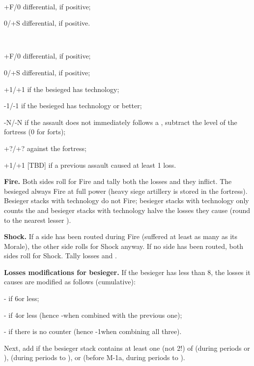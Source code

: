 ~\\
\begin{modlist}
\item[+F/0] \Fire differential, if positive;
\item[0/+S] \Shock differential, if positive.
\end{modlist}

~\\
\begin{modlist}
\item[+F/0] \Fire differential, if positive;
\item[0/+S] \Shock differential, if positive;
\item[+1/+1] if the besieged has \TMED technology;
\item[-1/-1] if the besieged has \TARQ technology or better;
\item[-N/-N] if the assault does not immediately follows a ,
  subtract the level of the fortress (0 for forts);
\item[+?/+?]  against the fortress;
\item[+1/+1] [TBD] if a previous assault caused at least 1 loss. %
\end{modlist}

\textbf{Fire.} Both sides roll for Fire and tally both the losses and
\textetoile they inflict. The besieged always Fire at full power (heavy siege
artillery is stored in the fortress). Besieger stacks with \TMED technology do
not Fire; besieger stacks with \TREN technology only counts the \textetoile
and besieger stacks with \TARQ technology halve the losses they cause (round
to the nearest lesser \texttu).

\textbf{Shock.} If a side has been routed during Fire (suffered at least as
many \textetoile as its Morale), the other side rolls for Shock anyway. If no
side has been routed, both sides roll for Shock. Tally losses and \textetoile.

\textbf{Losses modifications for besieger.} If the besieger has less than
8\LD, the losses it causes are modified as follows (cumulative):
\begin{modlist}
\item[-\texttu] if 6\LD or less;
\item[-\texttu] if 4\LD or less (hence -\texttd when combined with the
  previous one);
\item[-\texttd] if there is no \ARMY counter (hence -1\texttu when combining
  all three).
\end{modlist}
Next, add \texttd if the besieger stack contains at least one \ARMY\faceplus
(not 2\ARMY\facemoins !) of \POL (during periods  or ),
\RUS (during periods  to ), or \TUR \Janissaire (before
M-1a, during periods  to ).

